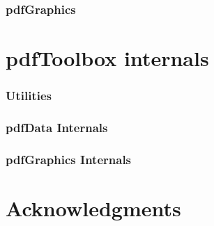 

\section{pdfGraphics}



\part{pdfToolbox internals}

\section{Utilities}



\section{pdfData Internals}



\section{pdfGraphics Internals}



\part{Acknowledgments}



\bye

